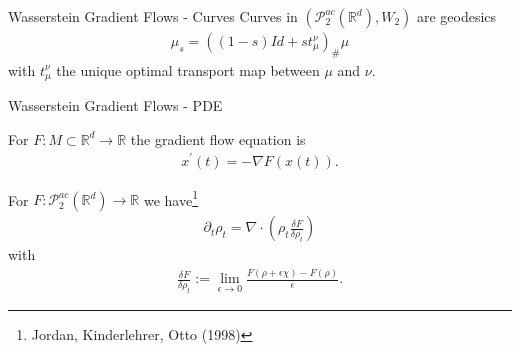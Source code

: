 \documentclass[aspectratio=149]{beamer}
\def\real{\mathbb{R}}
\newcommand{\variation}[1]{\ensuremath{\frac{\delta F}{\delta #1}}}
\begin{document}
\begin{frame}{Wasserstein Gradient Flows - Curves}
Curves in $\left(\mathcal{P}_{2}^{ac}(\real^{d}), W_2\right)$ are geodesics
\begin{align*}
\mu_s=((1-s)Id+st_{\mu}^{\nu})_{\#}\mu
\end{align*}
with $t_{\mu}^{\nu}$ the unique optimal transport map between $\mu$ and $\nu$.
\begin{figure}
\centering
{}
\end{figure}
\end{frame}

\begin{frame}{Wasserstein Gradient Flows - PDE}

For $F:M\subset \real^d\rightarrow \real$ the gradient flow equation is
\begin{align*}
x^\prime(t)=-\nabla F(x(t)).
\end{align*}

For $F:\mathcal{P}_{2}^{ac}(\real^{d})\rightarrow \real$
we have\footnote{Jordan, Kinderlehrer, Otto (1998)}
\begin{align}
\label{eq:pde}
\partial_{t}\rho_{t}=\nabla\cdot\left(\rho_{t}\variation{\rho_t}\right)
\end{align}
with
\begin{align*}
\variation{\rho_t}:=\lim_{\epsilon\rightarrow0}\frac{F(\rho+\epsilon\chi) - F(\rho)}{ \epsilon}.
\end{align*}
\end{frame}
\end{document}
